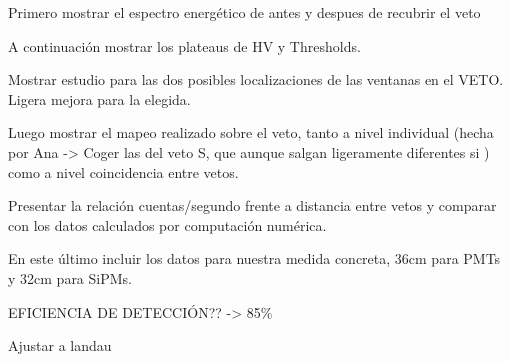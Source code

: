 Primero mostrar el espectro energético de antes y despues de recubrir el veto

A continuación mostrar los plateaus de HV y Thresholds.

Mostrar estudio para las dos posibles localizaciones de las ventanas en el VETO. Ligera mejora para la elegida.

Luego mostrar el mapeo realizado sobre el veto, tanto a nivel individual (hecha por Ana -> Coger las del veto S, que aunque salgan ligeramente diferentes si ) como a nivel coincidencia entre vetos.

Presentar la relación cuentas/segundo frente a distancia entre vetos y comparar con los datos calculados por computación numérica.

En este último incluir los datos para nuestra medida concreta, 36cm para PMTs y 32cm para SiPMs.


EFICIENCIA DE DETECCIÓN?? -> 85\%

Ajustar a landau